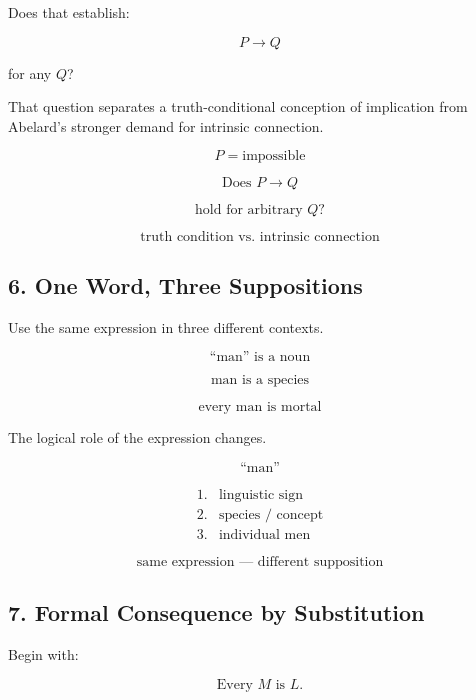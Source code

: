 \documentclass[11pt]{article}
\begin{document}
Does that establish:

\[
P\rightarrow Q
\]

for any \(Q\)?

That question separates a truth-conditional conception of
implication from Abelard's stronger demand for intrinsic
connection.

\begin{whiteboard}
\[
P = \text{impossible}
\]

\[
\text{Does }P\rightarrow Q
\]

\[
\text{hold for arbitrary }Q?
\]

\[
\boxed{\text{truth condition vs. intrinsic connection}}
\]
\end{whiteboard}


\subsection*{6. One Word, Three Suppositions}

Use the same expression in three different contexts.

\[
\text{``man'' is a noun}
\]

\[
\text{man is a species}
\]

\[
\text{every man is mortal}
\]

The logical role of the expression changes.

\begin{whiteboard}
\[
\text{``man''}
\]

\[
\begin{array}{ll}
1. & \text{linguistic sign}\\
2. & \text{species / concept}\\
3. & \text{individual men}
\end{array}
\]

\[
\boxed{\text{same expression --- different supposition}}
\]
\end{whiteboard}


\subsection*{7. Formal Consequence by Substitution}

Begin with:

\[
\text{Every }M\text{ is }L.
\]
\end{document}
